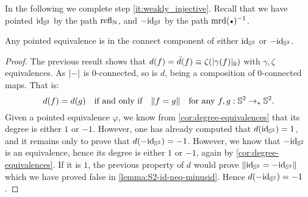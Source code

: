 \documentclass[english,a4paper]{lmcs}
\begin{document}
In the following we complete step \ref{it:weakly_injective}.
Recall that we have pointed $\mathord{\mathrm{id}}_{{\mathbb S^{2}}}$ by the path $\mathop{{\mathrm{refl}}_{\mathrm{N}}}$,
and $-\mathord{\mathrm{id}}_{{\mathbb S^{2}}}$ by the path $\inv{\mrd(\base)}$.
\begin{cor}
  Any pointed equivalence is in the connect component of either $\mathord{\mathrm{id}}_{{\mathbb S^{2}}}$ or $-\mathord{\mathrm{id}}_{{\mathbb S^{2}}}$.
  \label{cor:equivalence-conn-component}
\end{cor}
\begin{proof}
  The previous result shows that $d(f) = \bar d(f) \equiv
  \zeta(\lvert\gamma(f)\rvert_0)$ with $\gamma, \zeta$ equivalences. As
  $\lvert\mathord{{-}}\rvert$ is $0$-connected, so is $d$, being a composition of
  $0$-connected maps. That is:
  \begin{displaymath}
    d(f) = d(g) \quad \text{if and only if}\quad
    \lVert f = g\rVert \quad \text{for any}\ f,g:{{\mathbb S^{2}}} \to_\ast{{\mathbb S^{2}}}.
  \end{displaymath}
  Given a pointed equivalence $\varphi$, we know from
  \cref{cor:degree-equivalences} that its degree is either $1$ or $-1$.
  However, one has already computed that $d(\mathord{\mathrm{id}}_{{\mathbb S^{2}}}) = 1$, and it remains only
  to prove that $d(-\mathord{\mathrm{id}}_{{\mathbb S^{2}}}) = -1$. However, we know that $-\mathord{\mathrm{id}}_{{\mathbb S^{2}}}$ is an
  equivalence, hence its degree is either $1$ or $-1$, again by
  \cref{cor:degree-equivalences}. If it is $1$, the previous property of $d$
  would prove $\lVert\mathord{\mathrm{id}}_{{\mathbb S^{2}}} = -\mathord{\mathrm{id}}_{{\mathbb S^{2}}}\rVert$ which we have proved false in
  \cref{lemma:S2-id-neq-minusid}. Hence $d(-\mathord{\mathrm{id}}_{{\mathbb S^{2}}}) = -1$.

\end{proof}
\end{document}
